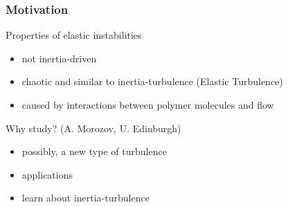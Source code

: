 \begin{frame}
  \frametitle{Motivation}
  \begin{block}{Properties of elastic instabilities}
    \begin{itemize}
    \item not inertia-driven
    \item chaotic and similar to inertia-turbulence (Elastic Turbulence)
    \item caused by interactions between polymer molecules and flow
    \end{itemize}
  \end{block}
  \begin{block}{Why study? (A. Morozov, U. Edinburgh)}
    \begin{itemize}
    \item possibly, a new type of turbulence
    \item applications
    \item learn about inertia-turbulence
    \end{itemize}
  \end{block}
\end{frame}


